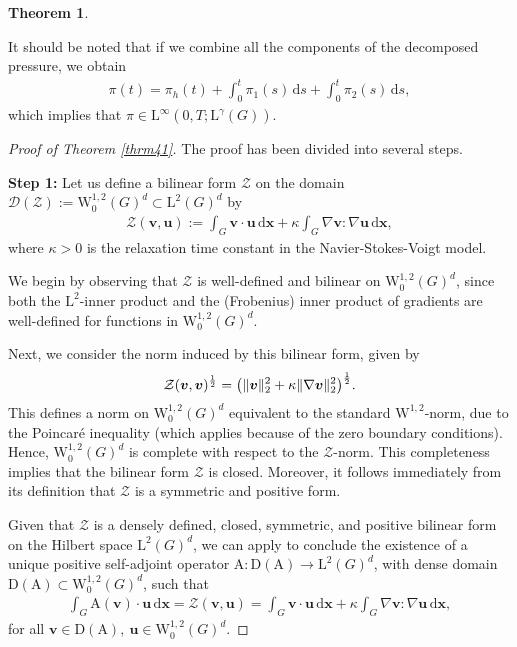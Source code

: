 \documentclass[12pt,reqno]{amsart}
\numberwithin{equation}{section}
\newtheorem{theorem}{Theorem}[section]
\let\originalleft\left
\let\originalright\right
\renewcommand{\left}{\mathopen{}\mathclose\bgroup\originalleft}
\renewcommand{\right}{\aftergroup\egroup\originalright}
\theoremstyle{definition}
\def\D{\mathrm{D}}
\def\W{\mathrm{W}}
\def\L{\mathrm{L}}
\def\uu{\boldsymbol{u}}  %
\def\vv{\boldsymbol{v}}
\def\x{\boldsymbol{x}}
\begin{document}
\begin{theorem}
{}

\end{theorem}
It should be noted that if we combine all the components of the decomposed pressure, we obtain
\begin{align*}
    \pi(t) = \pi_h(t) + \int_0^t \pi_{1}(s)\, \mathrm{d}s+\int_0^t \pi_{2}(s)\, \mathrm{d}s,
\end{align*}
which implies that $\pi \in \L^\infty(0,T; \L^\gamma(G))$.



\begin{proof}[Proof of Theorem \ref{thrm41}]
{
	The proof has been divided into {several steps}.
	
	\vspace{2mm}
	\noindent\textbf{Step 1:}
Let us define a bilinear form $\mathcal{Z}$ on the domain $\mathcal{D}(\mathcal{Z}) := \W_0^{1,2}(G)^d \subset \L^2(G)^d$ by
\begin{align*}
    \mathcal{Z}(\vv,\uu) := \int_{G} \vv \cdot \uu \, \mathrm{d}\x + \kappa \int_G \nabla \vv : \nabla \uu \, \mathrm{d}\x,
\end{align*}
where $\kappa > 0$ is the relaxation time constant in the Navier-Stokes-Voigt model.

We begin by observing that $\mathcal{Z}$ is well-defined and bilinear on $\W_0^{1,2}(G)^d$, since both the $\L^2$-inner product and the (Frobenius) inner product of gradients are well-defined for functions in $\W_0^{1,2}(G)^d$.

Next, we consider the norm induced by this bilinear form, given by
\begin{align*}
    \mathcal{Z}(\vv,\vv)^{\frac{1}{2}} = \left( \|\vv\|_{2}^2 + \kappa \|\nabla \vv\|_{2}^2 \right)^{\frac{1}{2}}.
\end{align*}
This defines a norm on $\W_0^{1,2}(G)^d$ equivalent to the standard $\W^{1,2}$-norm, due to the Poincaré inequality (which applies because of the zero boundary conditions). Hence, $\W_0^{1,2}(G)^d$ is complete with respect to the $\mathcal{Z}$-norm. This completeness implies that the bilinear form $\mathcal{Z}$ is closed. Moreover, it follows immediately from its definition that $\mathcal{Z}$ is a symmetric and positive form.

Given that $\mathcal{Z}$ is a densely defined, closed, symmetric, and positive bilinear form on the Hilbert space $\L^2(G)^d$, we can apply \cite[Lemma II.3.2.1]{HS} to conclude the existence of a unique positive self-adjoint operator $\mathrm{A}: \D(\mathrm{A}) \to \L^2(G)^d$, with dense domain $\D(\mathrm{A}) \subset \W_0^{1,2}(G)^d$, such that
\begin{align*}
    \int_G \mathrm{A}(\vv) \cdot \uu \, \mathrm{d}\x = \mathcal{Z}(\vv,\uu)
    = \int_{G} \vv \cdot \uu \, \mathrm{d}\x + \kappa \int_G \nabla \vv : \nabla \uu \, \mathrm{d}\x,
\end{align*}for all $\vv \in \D(\mathrm{A}),\ \uu \in \W_0^{1,2}(G)^d$.

}
\end{proof}
\end{document}
